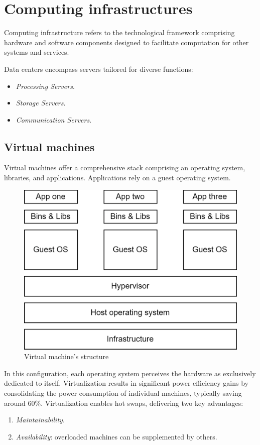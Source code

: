 \section{Computing infrastructures}

\begin{definition}
    Computing infrastructure refers to the technological framework comprising hardware and software components designed to facilitate computation for other systems and services.
\end{definition}

Data centers encompass servers tailored for diverse functions:
\begin{itemize}
    \item \textit{Processing Servers}.
    \item \textit{Storage Servers}.
    \item \textit{Communication Servers}.
\end{itemize}

\subsection{Virtual machines}
Virtual machines offer a comprehensive stack comprising an operating system, libraries, and applications. 
Applications rely on a guest operating system.
\begin{figure}[H]
    \centering
    \includegraphics[width=0.5\linewidth]{images/vm.png}
    \caption{Virtual machine's structure}
\end{figure}
In this configuration, each operating system perceives the hardware as exclusively dedicated to itself. 
Virtualization results in significant power efficiency gains by consolidating the power consumption of individual machines, typically saving around 60\%.
Virtualization enables hot swaps, delivering two key advantages:
\begin{enumerate}
    \item \textit{Maintainability}.
    \item \textit{Availability}: overloaded machines can be supplemented by others.
\end{enumerate}

